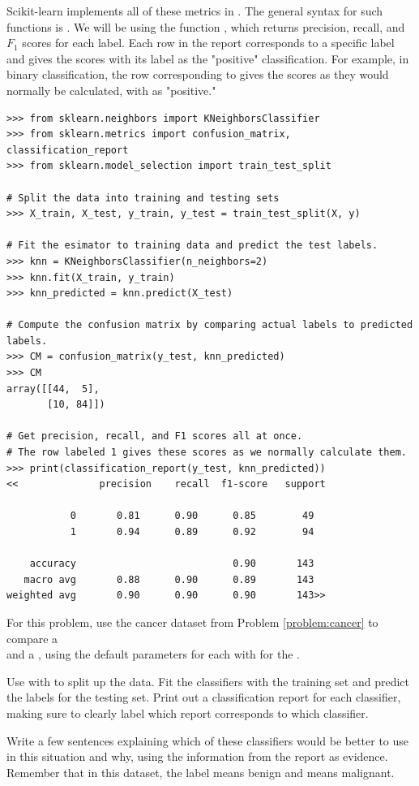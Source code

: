 Scikit-learn implements all of these metrics in .
The general syntax for such functions is .
We will be using the function , which returns precision, recall, and $F_1$ scores for each label.
Each row in the report corresponds to a specific label and gives the scores with its label as the "positive" classification.
For example, in binary classification, the row corresponding to  gives the scores as they would normally be calculated, with  as "positive."

\begin{lstlisting}
>>> from sklearn.neighbors import KNeighborsClassifier
>>> from sklearn.metrics import confusion_matrix, classification_report
>>> from sklearn.model_selection import train_test_split

# Split the data into training and testing sets
>>> X_train, X_test, y_train, y_test = train_test_split(X, y)

# Fit the esimator to training data and predict the test labels.
>>> knn = KNeighborsClassifier(n_neighbors=2)
>>> knn.fit(X_train, y_train)
>>> knn_predicted = knn.predict(X_test)

# Compute the confusion matrix by comparing actual labels to predicted labels.
>>> CM = confusion_matrix(y_test, knn_predicted)
>>> CM
array([[44,  5],
       [10, 84]])

# Get precision, recall, and F1 scores all at once.
# The row labeled 1 gives these scores as we normally calculate them.
>>> print(classification_report(y_test, knn_predicted))
<<              precision    recall  f1-score   support

           0       0.81      0.90      0.85        49
           1       0.94      0.89      0.92        94

    accuracy                           0.90       143
   macro avg       0.88      0.90      0.89       143
weighted avg       0.90      0.90      0.90       143>>
\end{lstlisting}

\begin{problem} %
For this problem, use the cancer dataset from Problem \ref{problem:cancer} to compare a \\  and a , using the default parameters for each with  for the .

Use  with  to split up the data.
Fit the classifiers with the training set and predict the labels for the testing set.
Print out a classification report for each classifier, making sure to clearly label which report corresponds to which classifier.

Write a few sentences explaining which of these classifiers would be better to use in this situation and why, using the information from the report as evidence.
Remember that in this dataset, the label  means benign and  means malignant.
\label{problem:validation}
\end{problem}

